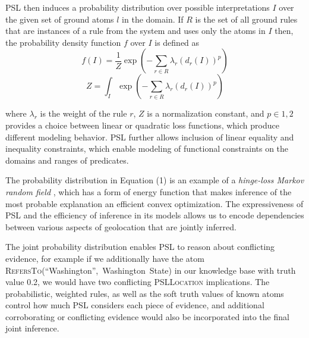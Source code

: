 \documentclass[letterpaper]{article}
\begin{document}
PSL then induces a probability distribution over possible
interpretations $\mathit{I}$ over the given set of ground atoms
$\mathit{l} $ in the domain.  If $\mathit{R}$ is the set of all ground
rules that are instances of a rule from the system and uses only the
atoms in  $\mathit{I}$ then, the probability density function
$\mathit{f}$ over $\mathit{I}$ is defined as
\begin{equation}
\label{eq:contimn1}
    f (I) = \frac{1}{Z} \exp \left(-\sum_{r\in R} \lambda_r (d_r(I))^p \right)
\end{equation}
\begin{equation}
\label{eq:contimn2}
	Z = \int_{I} \exp \left( -\sum_{r\in R} \lambda_r (d_r(I))^p \right)
\end{equation}

where $\lambda_r$ is the weight of the rule $r$, $Z$ is a normalization
constant, and $p \in {1, 2}$ provides a choice between linear or
quadratic loss functions, which produce different modeling behavior. PSL
further allows inclusion of linear equality and inequality constraints,
which enable modeling of functional constraints on the domains and
ranges of predicates. 

The probability distribution in Equation (1) is an example of a
\emph{hinge-loss Markov random field} \cite{bach:uai13}, which has a
form of energy function that makes inference of the most probable
explanation an efficient convex optimization. The expressiveness of PSL
and the efficiency of inference in its models allows us to encode
dependencies between various aspects of geolocation that are jointly
inferred.

\begin{exmp}
The joint probability distribution enables PSL to reason about
conflicting evidence, for example if we additionally have the atom
\mbox{\textsc{RefersTo}(``Washington'', Washington State)} in our
knowledge base with truth value 0.2, we would have two conflicting
\textsc{PSLLocation} implications.  The probabilistic, weighted rules,
as well as the soft truth values of known atoms control how much PSL
considers each piece of evidence, and additional corroborating or
conflicting evidence would also be incorporated into the final joint
inference.
\end{exmp}

\end{document}

